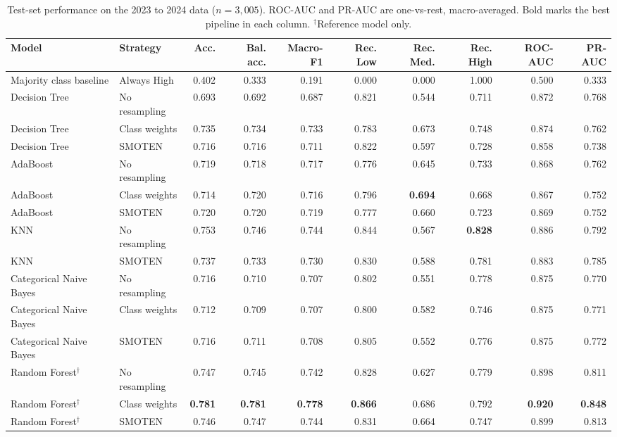 \begin{table}[t]
\caption{Test-set performance on the 2023 to 2024 data ($n = 3{,}005$). ROC-AUC and PR-AUC are one-vs-rest, macro-averaged. Bold marks the best pipeline in each column. $^\dagger$Reference model only.}
\label{tab:test_results}
\begin{tabular}{llrrrrrrrr}
\toprule
Model & Strategy & Acc. & Bal. acc. & Macro-F1 & Rec. Low & Rec. Med. & Rec. High & ROC-AUC & PR-AUC \\
\midrule
Majority class baseline & Always High & 0.402 & 0.333 & 0.191 & 0.000 & 0.000 & 1.000 & 0.500 & 0.333 \\
Decision Tree & No resampling & 0.693 & 0.692 & 0.687 & 0.821 & 0.544 & 0.711 & 0.872 & 0.768 \\
Decision Tree & Class weights & 0.735 & 0.734 & 0.733 & 0.783 & 0.673 & 0.748 & 0.874 & 0.762 \\
Decision Tree & SMOTEN & 0.716 & 0.716 & 0.711 & 0.822 & 0.597 & 0.728 & 0.858 & 0.738 \\
AdaBoost & No resampling & 0.719 & 0.718 & 0.717 & 0.776 & 0.645 & 0.733 & 0.868 & 0.762 \\
AdaBoost & Class weights & 0.714 & 0.720 & 0.716 & 0.796 & \textbf{0.694} & 0.668 & 0.867 & 0.752 \\
AdaBoost & SMOTEN & 0.720 & 0.720 & 0.719 & 0.777 & 0.660 & 0.723 & 0.869 & 0.752 \\
KNN & No resampling & 0.753 & 0.746 & 0.744 & 0.844 & 0.567 & \textbf{0.828} & 0.886 & 0.792 \\
KNN & SMOTEN & 0.737 & 0.733 & 0.730 & 0.830 & 0.588 & 0.781 & 0.883 & 0.785 \\
Categorical Naive Bayes & No resampling & 0.716 & 0.710 & 0.707 & 0.802 & 0.551 & 0.778 & 0.875 & 0.770 \\
Categorical Naive Bayes & Class weights & 0.712 & 0.709 & 0.707 & 0.800 & 0.582 & 0.746 & 0.875 & 0.771 \\
Categorical Naive Bayes & SMOTEN & 0.716 & 0.711 & 0.708 & 0.805 & 0.552 & 0.776 & 0.875 & 0.772 \\
Random Forest$^\dagger$ & No resampling & 0.747 & 0.745 & 0.742 & 0.828 & 0.627 & 0.779 & 0.898 & 0.811 \\
Random Forest$^\dagger$ & Class weights & \textbf{0.781} & \textbf{0.781} & \textbf{0.778} & \textbf{0.866} & 0.686 & 0.792 & \textbf{0.920} & \textbf{0.848} \\
Random Forest$^\dagger$ & SMOTEN & 0.746 & 0.747 & 0.744 & 0.831 & 0.664 & 0.747 & 0.899 & 0.813 \\
\bottomrule
\end{tabular}
\end{table}
